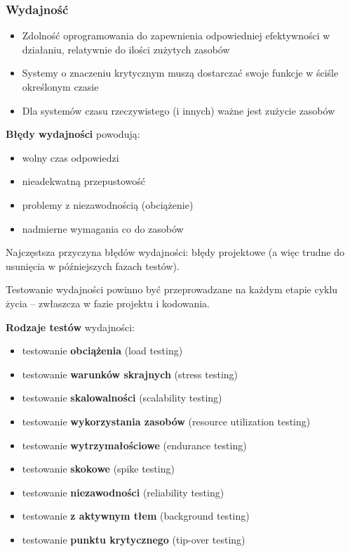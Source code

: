 \documentclass[../main.tex]{subfiles}
\begin{document}
    \subsubsection{Wydajność}
    \begin{itemize}
        \item Zdolność oprogramowania do zapewnienia odpowiedniej efektywności w działaniu, relatywnie do
        ilości zużytych zasobów
        \item Systemy o znaczeniu krytycznym muszą dostarczać swoje funkcje w ściśle określonym czasie
        \item Dla systemów czasu rzeczywistego (i innych) ważne jest zużycie zasobów
    \end{itemize}

    \textbf{Błędy wydajności} powodują:
    \begin{itemize}
        \item wolny czas odpowiedzi
        \item nieadekwatną przepustowość
        \item problemy z niezawodnością (obciążenie)
        \item nadmierne wymagania co do zasobów
    \end{itemize}

    Najczęstsza przyczyna błędów wydajności: błędy projektowe (a więc trudne do usunięcia w późniejszych fazach testów).

    Testowanie wydajności powinno być przeprowadzane na każdym etapie cyklu życia – zwłaszcza w fazie projektu i kodowania.

    \textbf{Rodzaje testów} wydajności:
    \begin{itemize}
        \item testowanie \textbf{obciążenia} (load testing)
        \item testowanie \textbf{warunków skrajnych} (stress testing)
        \item testowanie \textbf{skalowalności} (scalability testing)
        \item testowanie \textbf{wykorzystania zasobów} (resource utilization testing)
        \item testowanie \textbf{wytrzymałościowe} (endurance testing)
        \item testowanie \textbf{skokowe} (spike testing)
        \item testowanie \textbf{niezawodności} (reliability testing)
        \item testowanie \textbf{z aktywnym tłem} (background testing)
        \item testowanie \textbf{punktu krytycznego} (tip-over testing)
    \end{itemize}
\end{document}
